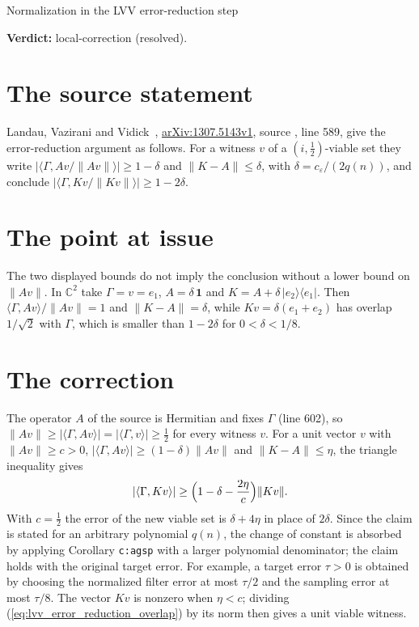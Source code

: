 \documentclass{article}
\providecommand{\gapnote}[2]{\par\noindent\textbf{Verdict:} #1 (#2).\par}
\begin{document}
\begin{center}
    {\Large Normalization in the LVV error-reduction step}
\end{center}
\gapnote{local-correction}{resolved}

\section{The source statement}
Landau, Vazirani and Vidick~\cite{Landau2015Polynomial},
\href{https://arxiv.org/abs/1307.5143v1}{arXiv:1307.5143v1}, source
, line 589, give the error-reduction argument as follows.
For a witness $v$ of a $(i,\tfrac12)$-viable set they write
$\bigl|\langle\Gamma, Av/\lVert Av\rVert\rangle\bigr| \ge 1-\delta$ and
$\lVert K-A\rVert\le\delta$, with $\delta = c_\varepsilon/(2q(n))$, and conclude
$\bigl|\langle\Gamma, Kv/\lVert Kv\rVert\rangle\bigr| \ge 1-2\delta$.

\section{The point at issue}
The two displayed bounds do not imply the conclusion without a lower bound on
$\lVert Av\rVert$. In $\mathbb{C}^2$ take $\Gamma=v=e_1$, $A=\delta\,\mathbf{1}$
and $K=A+\delta\,\lvert e_2\rangle\langle e_1\rvert$. Then
$\langle\Gamma, Av\rangle/\lVert Av\rVert = 1$ and $\lVert K-A\rVert=\delta$, while
$Kv=\delta(e_1+e_2)$ has overlap $1/\sqrt2$ with $\Gamma$, which is smaller than
$1-2\delta$ for $0<\delta<1/8$.

\section{The correction}
The operator $A$ of the source is Hermitian and fixes $\Gamma$ (line 602), so
$\lVert Av\rVert \ge \lvert\langle\Gamma, Av\rangle\rvert = \lvert\langle\Gamma,
    v\rangle\rvert \ge \tfrac12$ for every witness $v$. For a unit vector $v$ with
$\lVert Av\rVert\ge c>0$, $\lvert\langle\Gamma,Av\rangle\rvert\ge(1-\delta)\lVert
    Av\rVert$ and $\lVert K-A\rVert\le\eta$, the triangle inequality gives
\begin{align}
    \lvert\langle\Gamma, Kv\rangle\rvert \ge \Bigl(1-\delta-\frac{2\eta}{c}\Bigr)
    \lVert Kv\rVert .
    \label{eq:lvv_error_reduction_overlap}
\end{align}
With $c=\tfrac12$ the error of the new viable set is $\delta+4\eta$ in place of
$2\delta$. Since the claim is stated for an arbitrary polynomial $q(n)$, the
change of constant is absorbed by applying Corollary \texttt{c:agsp} with a
larger polynomial denominator; the claim holds with the original target error.
For example, a target error $\tau>0$ is obtained by choosing the normalized
filter error at most $\tau/2$ and the sampling error at most $\tau/8$.
The vector $Kv$ is nonzero when $\eta<c$; dividing
(\ref{eq:lvv_error_reduction_overlap}) by its norm then gives a unit viable witness.
\end{document}
